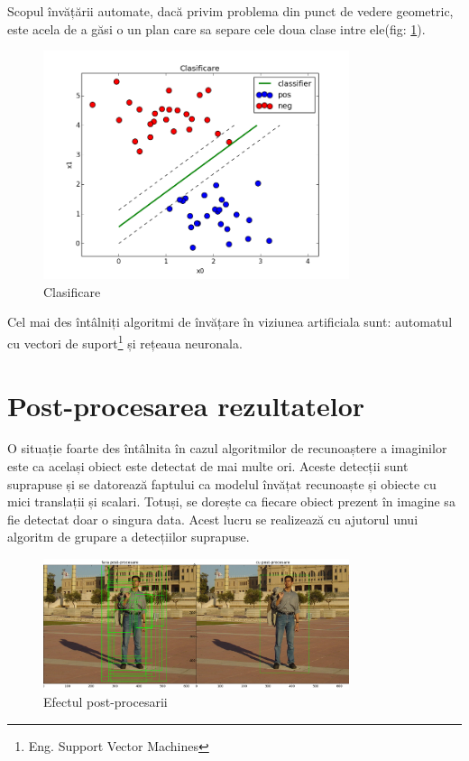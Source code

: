 Scopul învățării automate, dacă privim problema din punct de vedere geometric, este acela de a găsi o un plan care sa separe cele doua clase intre ele(fig: \ref{fig:fig_clasificare}).

\begin{figure}[h]
	\centering
		\includegraphics[width=0.8\textwidth]{imagini/fig_clasificare2.png}
	\caption{Clasificare}
	\label{fig:fig_clasificare}
\end{figure}

Cel mai des întâlniți algoritmi de învățare în viziunea artificiala sunt: automatul cu vectori de suport\footnote{Eng. Support Vector Machines}\cite{suykens1999least} și rețeaua neuronala.

\pagebreak
\section{Post-procesarea rezultatelor}

O situație foarte des întâlnita în cazul algoritmilor de recunoaștere a imaginilor este ca același obiect este detectat de mai multe ori.
Aceste detecții sunt suprapuse și se datorează faptului ca modelul învățat recunoaște și obiecte cu mici translații și scalari.
Totuși, se dorește ca fiecare obiect prezent în imagine sa fie detectat doar o singura data.
Acest lucru se realizează cu ajutorul unui algoritm de grupare a detecțiilor suprapuse.
\begin{figure}[h]
	\centering
		\includegraphics[width=0.8\textwidth]{imagini/nms.png}
	\caption{Efectul post-procesarii}
	\label{fig:nms}
\end{figure}


